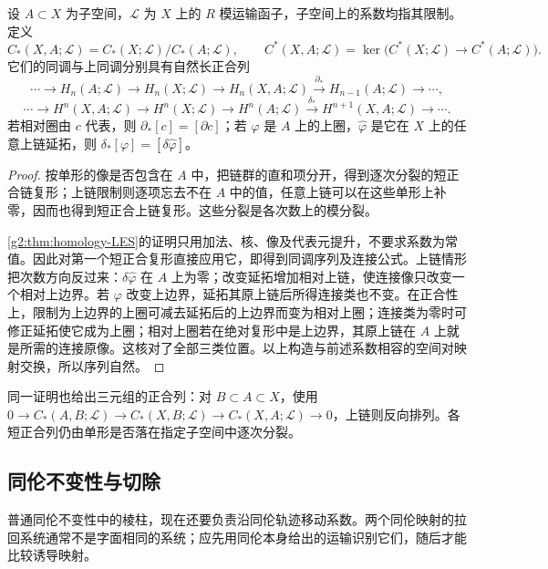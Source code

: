 \begin{proposition}\label{g2:prop:twisted-LES}
	设 \(A\subset X\) 为子空间，\(\mathcal L\) 为 \(X\) 上的 \(R\) 模运输函子，子空间上的系数均指其限制。定义
	\[
		C_*(X,A;\mathcal L)=C_*(X;\mathcal L)/C_*(A;\mathcal L),\qquad
		C^*(X,A;\mathcal L)=\ker\bigl(C^*(X;\mathcal L)\to C^*(A;\mathcal L)\bigr).
	\]
	它们的同调与上同调分别具有自然长正合列
	\[
		\cdots\longrightarrow H_n(A;\mathcal L)\longrightarrow H_n(X;\mathcal L)
		\longrightarrow H_n(X,A;\mathcal L)\xrightarrow{\partial_*}H_{n-1}(A;\mathcal L)\longrightarrow\cdots,
	\]
	\[
		\cdots\longrightarrow H^n(X,A;\mathcal L)\longrightarrow H^n(X;\mathcal L)
		\longrightarrow H^n(A;\mathcal L)\xrightarrow{\delta_*}H^{n+1}(X,A;\mathcal L)\longrightarrow\cdots.
	\]
	若相对圈由 \(c\) 代表，则 \(\partial_*[c]=[\partial c]\)；若 \(\varphi\) 是 \(A\) 上的上圈，\(\widehat\varphi\) 是它在 \(X\) 上的任意上链延拓，则 \(\delta_*[\varphi]=[\delta\widehat\varphi]\)。
\end{proposition}
\begin{proof}
	按单形的像是否包含在 \(A\) 中，把链群的直和项分开，得到逐次分裂的短正合链复形；上链限制则逐项忘去不在 \(A\) 中的值，任意上链可以在这些单形上补零，因而也得到短正合上链复形。这些分裂是各次数上的模分裂。

	\cref{g2:thm:homology-LES}的证明只用加法、核、像及代表元提升，不要求系数为常值。因此对第一个短正合复形直接应用它，即得到同调序列及连接公式。上链情形把次数方向反过来：\(\delta\widehat\varphi\) 在 \(A\) 上为零；改变延拓增加相对上链，使连接像只改变一个相对上边界。若 \(\varphi\) 改变上边界，延拓其原上链后所得连接类也不变。在正合性上，限制为上边界的上圈可减去延拓后的上边界而变为相对上圈；连接类为零时可修正延拓使它成为上圈；相对上圈若在绝对复形中是上边界，其原上链在 \(A\) 上就是所需的连接原像。这核对了全部三类位置。以上构造与前述系数相容的空间对映射交换，所以序列自然。
\end{proof}

同一证明也给出三元组的正合列：对 \(B\subset A\subset X\)，使用 \(0\to C_*(A,B;\mathcal L)\to C_*(X,B;\mathcal L)\to C_*(X,A;\mathcal L)\to0\)，上链则反向排列。各短正合列仍由单形是否落在指定子空间中逐次分裂。

\subsection{同伦不变性与切除}
\label{g2:subsec:0502:04}
普通同伦不变性中的棱柱，现在还要负责沿同伦轨迹移动系数。两个同伦映射的拉回系统通常不是字面相同的系统；应先用同伦本身给出的运输识别它们，随后才能比较诱导映射。

